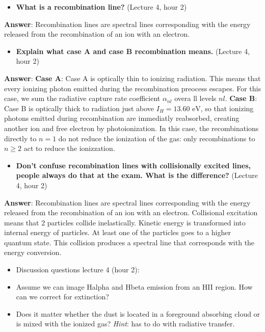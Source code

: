 \documentclass[11pt]{article}
\providecommand{\tightlist}{%
      \setlength{\itemsep}{0pt}\setlength{\parskip}{0pt}}
\begin{document}
    \begin{itemize}
\tightlist
\item
  \textbf{What is a recombination line?} (Lecture 4, hour 2)
\end{itemize}

\textbf{Answer}: Recombination lines are spectral lines corresponding
with the energy released from the recombination of an ion with an
electron.

    \begin{itemize}
\tightlist
\item
  \textbf{Explain what case A and case B recombination means.} (Lecture
  4, hour 2)
\end{itemize}

\textbf{Answer}: \textbf{Case A}: Case A is optically thin to ionizing
radiation. This means that every ionizing photon emitted during the
recombination preocess escapes. For this case, we sum the radiative
capture rate coefficient \(\alpha_{nl}\) overa ll levels \(nl\).
\textbf{Case B}: Case B is optically thick to radiation just above
\(I_H = 13.60 \text{ eV}\), so that ionizing photons emitted during
recombination are immediatly reabsorbed, creating another ion and free
electron by photoionization. In this case, the recombinations directly
to \(n=1\) do not reduce the ionization of the gas: only recombinations
to \(n \geq 2\) act to reduce the ionizzation.

    \begin{itemize}
\tightlist
\item
  \textbf{Don't confuse recombination lines with collisionally excited
  lines, people always do that at the exam. What is the difference?}
  (Lecture 4, hour 2)
\end{itemize}

\textbf{Answer}: Recombination lines are spectral lines corresponding
with the energy released from the recombination of an ion with an
electron. Collisional excitation means that 2 particles collide
inelastically. Kinetic energy is transformed into internal energy of
particles. At least one of the particles goes to a higher quantum state.
This collision produces a spectral line that corresponds with the energy
conversion.

    \begin{itemize}
\tightlist
\item
  Discussion questions lecture 4 (hour 2):
\item
  Assume we can image Halpha and Hbeta emission from an HII region. How
  can we correct for extinction?
\item
  Does it matter whether the dust is located in a foreground absorbing
  cloud or is mixed with the ionized gas? \emph{Hint}: has to do with
  radiative transfer.
\end{itemize}
\end{document}
